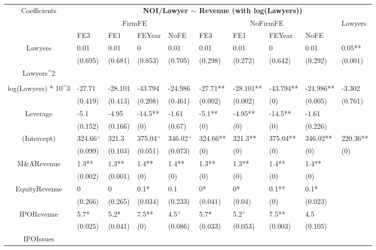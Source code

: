 \documentclass{article}
\begin{document}
\begin{table}[H]
\centering
\begin{tabular}{|clllllllll|}
\hline
\multirow{3}{*}{Coefficients} & \multicolumn{9}{c|}{\textbf{NOI/Lawyer $\sim$ Revenue (with log(Lawyers))}} \\
\cline{2-10}
& \multicolumn{4}{c}{FirmFE} & \multicolumn{4}{c}{NoFirmFE} & \multirow{2}{*}{Lawyers} \\
\cline{2-9}
& FE3 & FE1 & FEYear & NoFE & FE3 & FE1 & FEYear & NoFE &  \\
\hline
 
Lawyers & 0.01 & 0.01 & 0 & 0.01 & 0.01 & 0.01 & 0 & 0.01 & 0.05** \\ 
   & (0.695) & (0.681) & (0.853) & (0.705) & (0.298) & (0.272) & (0.642) & (0.292) & (0.001) \\ 
  Lawyers^2 &  &  &  &  &  &  &  &  &  \\ 
   &  &  &  &  &  &  &  &  &  \\ 
  log(Lawyers) * 10^3 & -27.71 & -28.101 & -43.794 & -24.986 & -27.71** & -28.101** & -43.794** & -24.986** & -3.302 \\ 
   & (0.419) & (0.413) & (0.208) & (0.461) & (0.002) & (0.002) & (0) & (0.005) & (0.761) \\ 
  Leverage & -5.1 & -4.95 & -14.5** & -1.61 & -5.1** & -4.95** & -14.5** & -1.61 &  \\ 
   & (0.152) & (0.166) & (0) & (0.67) & (0) & (0) & (0) & (0.226) &  \\ 
  (Intercept) & 324.66$^{+}$ & 321.3 & 375.04$^{+}$ & 346.02$^{+}$ & 324.66** & 321.3** & 375.04** & 346.02** & 220.36** \\ 
   & (0.099) & (0.103) & (0.051) & (0.073) & (0) & (0) & (0) & (0) & (0) \\ 
  M\&ARevenue & 1.3** & 1.3** & 1.4** & 1.4** & 1.3** & 1.3** & 1.4** & 1.4** &  \\ 
   & (0.002) & (0.001) & (0) & (0) & (0) & (0) & (0) & (0) &  \\ 
  EquityRevenue & 0 & 0 & 0.1* & 0.1 & 0* & 0* & 0.1** & 0.1* &  \\ 
   & (0.266) & (0.265) & (0.034) & (0.233) & (0.041) & (0.04) & (0) & (0.023) &  \\ 
  IPORevenue & 5.7* & 5.2* & 7.5** & 4.5$^{+}$ & 5.7* & 5.2$^{+}$ & 7.5** & 4.5 &  \\ 
   & (0.025) & (0.041) & (0) & (0.086) & (0.033) & (0.053) & (0.003) & (0.105) &  \\ 
  IPOIssues &  &  &  &  &  &  &  &  &  \\ 

\end{tabular}
\end{table}
\end{document}
